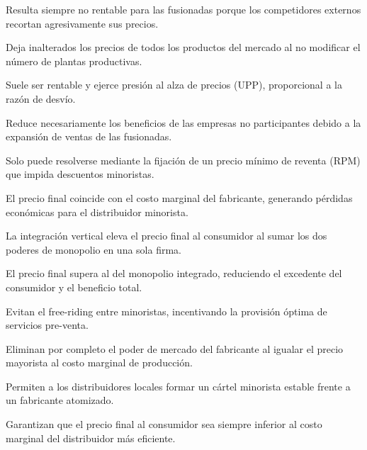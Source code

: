 \begin{opts}
    \item Resulta siempre no rentable para las fusionadas porque los competidores externos recortan agresivamente sus precios.
    \item Deja inalterados los precios de todos los productos del mercado al no modificar el número de plantas productivas.
    \item Suele ser rentable y ejerce presión al alza de precios (UPP), proporcional a la razón de desvío.
    \item Reduce necesariamente los beneficios de las empresas no participantes debido a la expansión de ventas de las fusionadas.
\end{opts}

\begin{opts}
    \item Solo puede resolverse mediante la fijación de un precio mínimo de reventa (RPM) que impida descuentos minoristas.
    \item El precio final coincide con el costo marginal del fabricante, generando pérdidas económicas para el distribuidor minorista.
    \item La integración vertical eleva el precio final al consumidor al sumar los dos poderes de monopolio en una sola firma.
    \item El precio final supera al del monopolio integrado, reduciendo el excedente del consumidor y el beneficio total.
\end{opts}

\begin{opts}
    \item Evitan el free-riding entre minoristas, incentivando la provisión óptima de servicios pre-venta.
    \item Eliminan por completo el poder de mercado del fabricante al igualar el precio mayorista al costo marginal de producción.
    \item Permiten a los distribuidores locales formar un cártel minorista estable frente a un fabricante atomizado.
    \item Garantizan que el precio final al consumidor sea siempre inferior al costo marginal del distribuidor más eficiente.
\end{opts}

